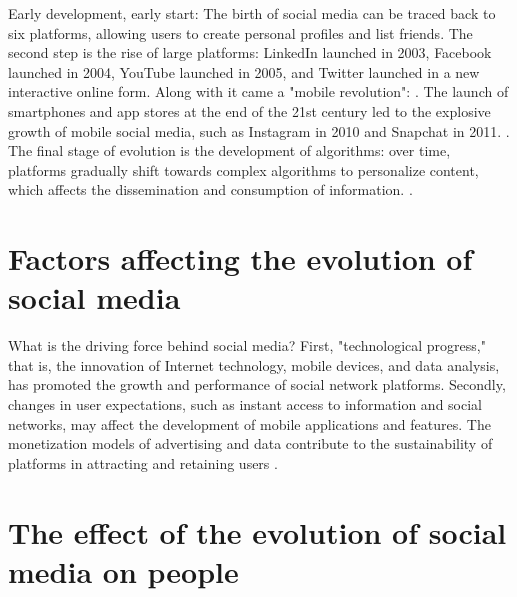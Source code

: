 \documentclass[man,floatsintext]{apa7}
\begin{document}
Early development, early start: The birth of social media can be traced back to six platforms, allowing users to create personal profiles and list friends. The second step is the rise of large platforms: LinkedIn launched in 2003, Facebook launched in 2004, YouTube launched in 2005, and Twitter launched in a new interactive online form. Along with it came a "mobile revolution": \autocite[531-558]{kapoorAdvancesSocialMedia2018}. The launch of smartphones and app stores at the end of the 21st century led to the explosive growth of mobile social media, such as Instagram in 2010 and Snapchat in 2011. \autocite{mcintyreEvolutionSocialMedia2014}. The final stage of evolution is the development of algorithms: over time, platforms gradually shift towards complex algorithms to personalize content, which affects the dissemination and consumption of information. \autocite{prellSocialNetworkAnalysis2012}. 

\section{Factors affecting the evolution of social media}

What is the driving force behind social media? First, "technological progress," that is, the innovation of Internet technology, mobile devices, and data analysis, has promoted the growth and performance of social network platforms. Secondly, changes in user expectations, such as instant access to information and social networks, may affect the development of mobile applications and features. The monetization models of advertising and data contribute to the sustainability of platforms in attracting and retaining users \autocite{kaunJoseVanDijck2014}.

\section{The effect of the evolution of social media on people}
\end{document}
